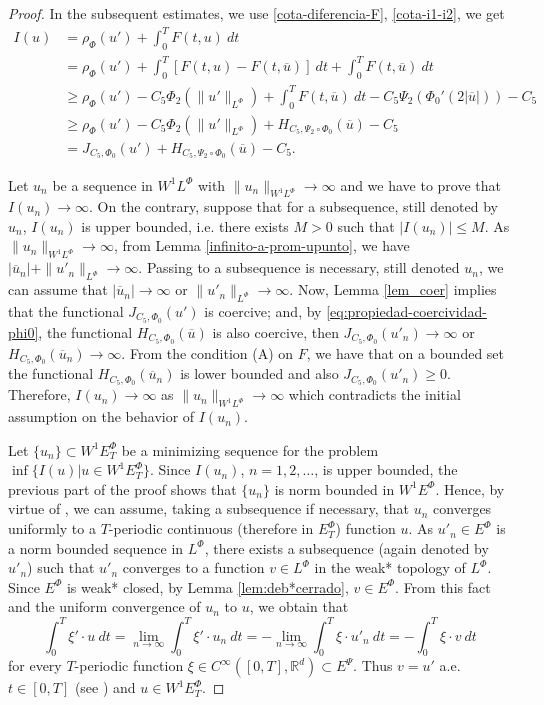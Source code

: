 \documentclass[twoside]{article}
\theoremstyle{remark}
\newcommand{\orlnor}{\|_{L^{\Phi}}}
\newcommand{\lphi}{L^{\Phi}}
\newcommand{\ephi}{E^{\Phi}}
\newcommand{\wphi}{W^{1}\lphi}
\newcommand{\wphiet}{W^{1}\ephi_T}
\newcommand{\wphie}{W^{1}\ephi}
\newcommand{\sobnor}{\|_{W^{1}\lphi}}
\newcommand{\rr}{\mathbb{R}}
\renewcommand{\leq}{\leqslant}
\renewcommand{\geq}{\geqslant}
\newcommand{\epsi}{E^{\Psi}}
\begin{document}
\begin{proof}
In the subsequent estimates, we use  \eqref{cota-diferencia-F},
\eqref{cota-i1-i2}, we get
\begin{equation}\label{cota_inf_I}
\begin{split}
I(u)&
=\rho_{\Phi}(u')+\int_0^TF(t,u)\ dt
\\ 
&=\rho_{\Phi}( u')+ \int_0^T \left[F(t,u)-F(t,\overline{u})\right]\ dt
+  \int_0^TF(t,\overline{u})\ dt
\\
&\geq \rho_{\Phi}( u')
-C_5 \Phi_2(\|u'\orlnor)
+\int_0^TF(t,\overline{u})\ dt-
C_5 \Psi_2(\Phi_0'(2|\overline{u}|))-
C_5
\\
&\geq 
\rho_{\Phi}( u')
-C_5 \Phi_2(\|u'\orlnor)
+H_{C_5, \Psi_2\circ\Phi_0}(\overline{u})
-C_5
\\
&=
J_{C_5,\Phi_0}(u')
+H_{C_5, \Psi_2\circ\Phi_0}(\overline{u})
-C_5.
\end{split}
\end{equation}



Let $u_n$ be  a sequence in $\wphi$ with
$\|u_n\sobnor\to\infty$ and we have to prove that $I(u_n)\to\infty$.
On the contrary, suppose  that for a subsequence,
still denoted by $u_n$, $I(u_n)$ is upper bounded, i.e. there exists $M>0$ such that $|I(u_{n})|\leq M$.
As $\|u_n\sobnor\to\infty$, from Lemma \ref{infinito-a-prom-upunto},  we have $|\overline{u}_n|+\|u'_n\orlnor\to \infty$. Passing to a subsequence is necessary, still denoted $u_n$, we can assume that $|\overline{u}_n|\to \infty$ or $\|u'_n\orlnor\to \infty$.
Now, Lemma \ref{lem_coer} implies that the functional $J_{C_5,\Phi_0}(u')$ is coercive;
and, by \eqref{eq:propiedad-coercividad-phi0},
the functional $H_{C_5,\Phi_0}(\overline{u})$ is also coercive, then
$J_{C_5,\Phi_0}(u'_n) \to \infty$ or $H_{C_5,\Phi_0}(\overline{u}_n)\to \infty$.
From the condition (A) on $F$, we have that on a bounded set the functional $H_{C_5,\Phi_0}(\overline{u}_n)$ is lower bounded and
also $J_{C_5,\Phi_0}(u'_n)\geq 0$.
Therefore,  $I(u_n)\to\infty$ as $\|u_n\sobnor\to\infty$ which contradicts the initial assumption on the behavior of $I(u_n)$.

Let $\{u_n\}\subset \wphiet$  be a  minimizing sequence for the problem  $\inf\{I(u)|u\in\wphiet\}$.
Since  $I(u_n)$, $n=1,2,\ldots$,  is upper bounded, the previous part of the proof shows that $\{u_n\}$ is norm bounded in $\wphie$. Hence, by virtue of  \cite[Cor. 2.2]{ABGMS2015}, we can assume, taking a subsequence if necessary, that $u_n$ converges uniformly to a $T$-periodic continuous (therefore in $\ephi_T$)  function $u$. As $u'_n \in \ephi$ is a norm bounded sequence in $\lphi$,
there exists a subsequence (again denoted by $u'_n$) such that $u'_n$ converges to a function $v\in\lphi$ in the weak* topology of $\lphi$.
Since $\ephi$ is weak* closed, by Lemma \ref{lem:deb*cerrado}, $v\in \ephi$. From this fact and the uniform convergence of $u_n$ to $u$, we obtain that
\[
\int_0^T\xi'\cdot u\ dt=\lim_{n\to\infty}\int_0^T\xi'\cdot u_n \ dt=
-\lim_{n\to\infty}\int_0^T\xi\cdot u'_n\ dt=-\int_0^T\xi\cdot v\ dt
\]
for every $T$-periodic function $\xi\in C^{\infty}([0,T],\rr^d)\subset\epsi$.
Thus $v=u'$ a.e. $t\in [0,T]$ (see \cite[p. 6]{mawhin2010critical}) and $u\in\wphiet$.


\end{proof}
\end{document}
